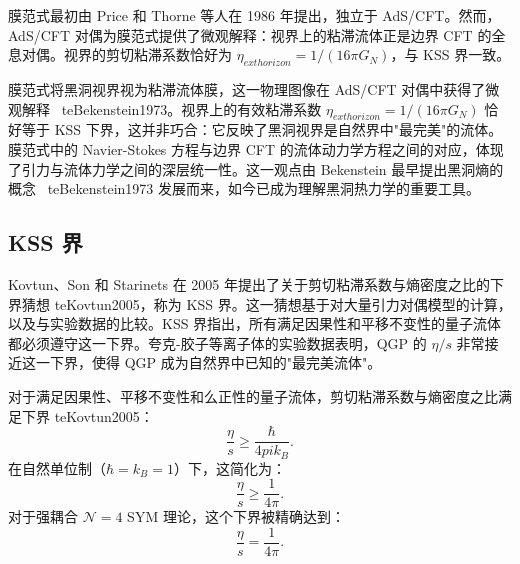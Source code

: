 \begin{remark}
膜范式最初由 Price 和 Thorne 等人在 1986 年提出，独立于 AdS/CFT。然而，AdS/CFT 对偶为膜范式提供了微观解释：视界上的粘滞流体正是边界 CFT 的全息对偶。视界的剪切粘滞系数恰好为 $\eta_{	ext{horizon}} = 1/(16\pi G_N)$，与 KSS 界一致。
\end{remark}

\begin{remark}[膜范式的深层意义]
膜范式将黑洞视界视为粘滞流体膜，这一物理图像在 AdS/CFT 对偶中获得了微观解释 \	te{Bekenstein1973}。视界上的有效粘滞系数 $\eta_{	ext{horizon}} = 1/(16\pi G_N)$ 恰好等于 KSS 下界，这并非巧合：它反映了黑洞视界是自然界中"最完美"的流体。膜范式中的 Navier-Stokes 方程与边界 CFT 的流体动力学方程之间的对应，体现了引力与流体力学之间的深层统一性。这一观点由 Bekenstein 最早提出黑洞熵的概念 \	te{Bekenstein1973} 发展而来，如今已成为理解黑洞热力学的重要工具。
\end{remark}

\subsection{KSS 界}

\begin{note}[物理动机]
Kovtun、Son 和 Starinets 在 2005 年提出了关于剪切粘滞系数与熵密度之比的下界猜想 	te{Kovtun2005}，称为 KSS 界。这一猜想基于对大量引力对偶模型的计算，以及与实验数据的比较。KSS 界指出，所有满足因果性和平移不变性的量子流体都必须遵守这一下界。夸克-胶子等离子体的实验数据表明，QGP 的 $\eta/s$ 非常接近这一下界，使得 QGP 成为自然界中已知的"最完美流体"。
\end{note}

\begin{theorem}[KSS 界]\label{thm:KSS-bound}
对于满足因果性、平移不变性和么正性的量子流体，剪切粘滞系数与熵密度之比满足下界 	te{Kovtun2005}：
\begin{equation}\label{eq:KSS-bound}
    \boxed{\frac{\eta}{s} \geq \frac{\hbar}{4pi k_B}.}
\end{equation}
在自然单位制（$\hbar = k_B = 1$）下，这简化为：
\begin{equation}
    \frac{\eta}{s} \geq \frac{1}{4\pi}.
\end{equation}
对于强耦合 $\mathcal{N}=4$ SYM 理论，这个下界被精确达到：
\begin{equation}
    \frac{\eta}{s} = \frac{1}{4\pi}.
\end{equation}
\end{theorem}

